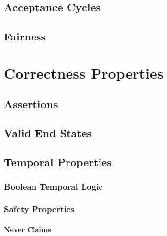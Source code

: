 \documentclass[a4paper, 11pt, accentcolor = tud3b]{tudreport}
\begin{document}
            \subsection{Acceptance Cycles} %

            \subsection{Fairness} %

        \section{Correctness Properties} %

            \subsection{Assertions} %

            \subsection{Valid End States} %

            \subsection{Temporal Properties} %

                \subsubsection{Boolean Temporal Logic} %

                \subsubsection{Safety Properties} %

                    \paragraph{Never Claims} %
\end{document}
